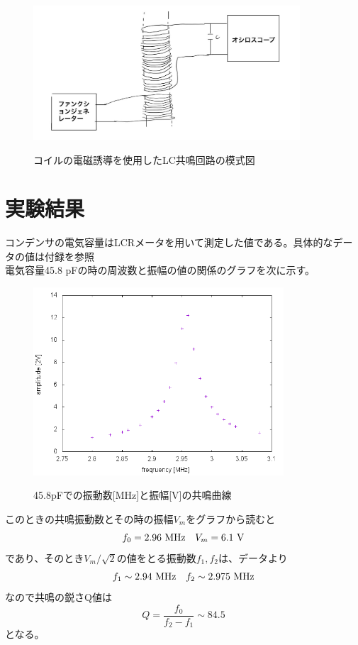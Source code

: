 \begin{figure}[H]
\centering
\includegraphics[height=5cm,clip]{kadono/image/houhou2.jpg}
\label{fig:ele1}
\caption{コイルの電磁誘導を使用したLC共鳴回路の模式図}
\end{figure}







\newpage
 \section{実験結果}
コンデンサの電気容量はLCRメータを用いて測定した値である。具体的なデータの値は付録を参照\\
電気容量45.8 pFの時の周波数と振幅の値の関係のグラフを次に示す。
\begin{figure}[H]
\centering
\includegraphics[height=7cm,clip]{kadono/image/45_8.png}
\label{fig:45.8}
\caption{45.8pFでの振動数[MHz]と振幅[V]の共鳴曲線}
\end{figure}
このときの共鳴振動数とその時の振幅$V_m$をグラフから読むと
\[
f_0=2.96\ {\rm MHz}\ \ \ V_m = 6.1\ {\rm V}
\]
であり、そのとき$V_m/\sqrt{2}$の値をとる振動数$f_1,f_2$は、データより
\[
f_1\sim 2.94\ {\rm MHz}\ \ \ f_2 \sim 2.975\ {\rm MHz}
\]
なので共鳴の鋭さQ値は
\[
Q=\frac{f_0}{f_2-f_1}\sim84.5
\]
となる。

